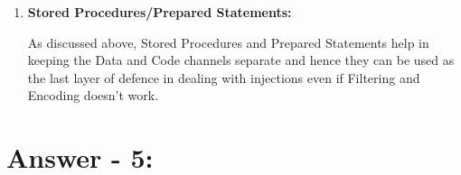 \documentclass[10pt,a4paper,oneside]{article}
\begin{document}
\begin{enumerate}
\begin{lstlisting}[
           language=PHP,
           showspaces=false,
           basicstyle=\ttfamily\scriptsize,
           commentstyle=\color{black}
        ]
<?php
echo '<a href="http://example.com/department_list_script/',
    rawurlencode('sales and marketing/Miami'), '">';
?>
\end{lstlisting}

\lstset{keywordstyle=\bfseries}
\begin{lstlisting}[
           language=PHP,
           showspaces=false,
           basicstyle=\ttfamily\tiny,
           commentstyle=\color{black}
        ]

<a href="http://example.com/department_list_script/sales%20and%20marketing%2FMiami">
\end{lstlisting}

\item \textbf{Stored Procedures/Prepared Statements:}

As discussed above, Stored Procedures and Prepared Statements help in keeping the Data and Code channels separate and hence they can be used as the last layer of defence in dealing with injections even if Filtering and Encoding doesn't work.
\end{enumerate}

\section*{Answer - 5:}
\end{document}
